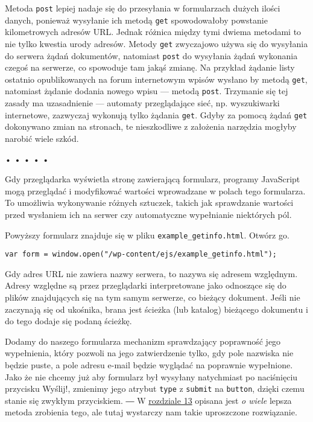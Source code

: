   
Metoda \texttt{post} lepiej nadaje się do przesyłania w formularzach dużych ilości danych, ponieważ wysyłanie ich metodą \texttt{get} spowodowałoby powstanie kilometrowych adresów URL. Jednak różnica między tymi dwiema metodami to nie tylko kwestia urody adresów. Metody \texttt{get} zwyczajowo używa się do wysyłania do serwera żądań dokumentów, natomiast \texttt{post} do wysyłania żądań wykonania czegoś na serwerze, co spowoduje tam jakąś zmianę. Na przykład żądanie listy ostatnio opublikowanych na forum internetowym wpisów wysłano by metodą \texttt{get}, natomiast żądanie dodania nowego wpisu — metodą \texttt{post}. Trzymanie się tej zasady ma uzasadnienie — automaty przeglądające sieć, np. wyszukiwarki internetowe, zazwyczaj wykonują tylko żądania \texttt{get}. Gdyby za pomocą żądań \texttt{get} dokonywano zmian na stronach,  te nieszkodliwe z założenia narzędzia mogłyby narobić wiele szkód.



\begin{center}
• • • • •
\end{center}

  
Gdy przeglądarka wyświetla stronę zawierającą formularz, programy JavaScript mogą przeglądać i modyfikować wartości wprowadzane w polach tego formularza. To umożliwia wykonywanie różnych sztuczek, takich jak sprawdzanie wartości przed wysłaniem ich na serwer czy automatyczne wypełnianie niektórych pól.

  
Powyższy formularz znajduje się w pliku \texttt{example\_getinfo.html}. Otwórz go.

  
\begin{verbatim} 
var form = window.open("/wp-content/ejs/example_getinfo.html");
\end{verbatim}
  
Gdy adres URL nie zawiera nazwy serwera, to nazywa się adresem względnym. Adresy względne są przez przeglądarki interpretowane jako odnoszące się do plików znajdujących się na tym samym serwerze, co bieżący dokument. Jeśli nie zaczynają się od ukośnika, brana jest ścieżka (lub katalog) bieżącego dokumentu i do tego dodaje się podaną ścieżkę.

  
Dodamy do naszego formularza mechanizm sprawdzający poprawność jego wypełnienia, który pozwoli na jego zatwierdzenie tylko, gdy pole nazwiska nie będzie puste, a pole adresu e-mail będzie wyglądać na poprawnie wypełnione. Jako że nie chcemy już aby formularz był wysyłany natychmiast po naciśnięciu przycisku Wyślij!, zmienimy jego atrybut \texttt{type} z \texttt{submit} na \texttt{button}, dzięki czemu stanie się zwykłym przyciskiem. ― W \hyperref[chap:13]{rozdziale 13} opisana jest \emph{o wiele} lepsza metoda zrobienia tego, ale tutaj wystarczy nam takie uproszczone rozwiązanie.



